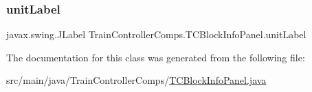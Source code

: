 \subsubsection{\texorpdfstring{unit\+Label}{unitLabel}}
{\footnotesize\ttfamily javax.\+swing.\+J\+Label Train\+Controller\+Comps.\+T\+C\+Block\+Info\+Panel.\+unit\+Label\hspace{0.3cm}{\ttfamily [private]}}



The documentation for this class was generated from the following file\+:\begin{DoxyCompactItemize}
\item 
src/main/java/\+Train\+Controller\+Comps/\hyperlink{TCBlockInfoPanel_8java}{T\+C\+Block\+Info\+Panel.\+java}\end{DoxyCompactItemize}
